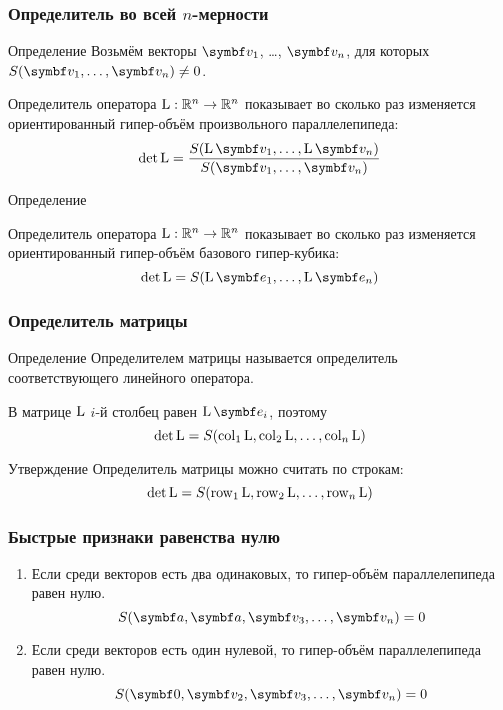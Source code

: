 \begin{frame}
    \frametitle{Определитель во всей $n$-мерности}

    \begin{block}{Определение}
        Возьмём векторы $\bv_1$, \ldots, $\bv_n$, для которых $S(\bv_1, \ldots, \bv_n)\neq 0$.

        \alert{Определитель} оператора $\operatorname{L}:\mathbb{R}^n \to \mathbb{R}^n$ показывает во сколько раз изменяется
        ориентированный гипер-объём произвольного параллелепипеда:
        \[
            \det \LL = \frac{S(\LL\bv_1, \ldots, \LL\bv_n)}{S(\bv_1, \ldots, \bv_n)}    
        \]
    \end{block}  
    
    \pause

\begin{block}{Определение}

    \alert{Определитель} оператора $\operatorname{L}:\mathbb{R}^n \to \mathbb{R}^n$ показывает во сколько раз изменяется
    ориентированный гипер-объём базового гипер-кубика:
    \[
        \det \LL = S(\LL\be_1, \ldots, \LL\be_n)
    \]
\end{block}  


\end{frame}



\begin{frame}
    \frametitle{Определитель матрицы}

    \begin{block}{Определение}
        \alert{Определителем матрицы} называется определитель соответствующего линейного оператора. 
    \end{block}
    
    \pause

    В матрице $\operatorname{L}$ $i$-й столбец равен $\LL\be_i$, поэтому 
    \[
    \det \operatorname{L} = S(\operatorname{col}_1 \operatorname{L}, \operatorname{col}_2 \operatorname{L}, \ldots, \operatorname{col}_n \operatorname{L})    
    \]

    \pause
    \begin{block}{Утверждение}
        Определитель матрицы можно считать по строкам: 
    \[
    \det \operatorname{L} = S(\operatorname{row}_1 \operatorname{L}, \operatorname{row}_2 \operatorname{L}, \ldots, \operatorname{row}_n \operatorname{L})    
    \]    
    \end{block}
\end{frame}





\begin{frame}
    \frametitle{Быстрые признаки равенства нулю}

    \begin{enumerate}
        \item Если среди векторов есть два одинаковых, то 
        гипер-объём параллелепипеда равен нулю. 
        \[
            S(\ba, \ba, \bv_3, \ldots, \bv_n) = 0
        \]
        \pause
        \item Если среди векторов есть один нулевой, то 
        гипер-объём параллелепипеда равен нулю. 
        \[
            S(\bzero, \bv_2, \bv_3, \ldots, \bv_n) = 0
        \]
        \end{enumerate}

\end{frame}

